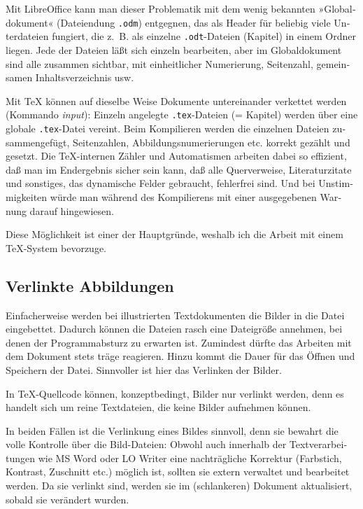 \documentclass[11pt,a4paper,ngerman,french,DIV=8]{scrartcl}
\begin{document}
\begin{otherlanguage}{ngerman}
Mit LibreOffice kann man dieser Problematik mit dem wenig bekannten »Globaldokument« (Dateiendung \texttt{.odm}) entgegnen, das als Header für beliebig viele Unterdateien fungiert, die z.~B. als einzelne \texttt{.odt}-Dateien (Kapitel) in einem Ordner liegen. Jede der Dateien läßt sich einzeln bearbeiten, aber im Globaldokument sind alle zusammen sichtbar, mit einheitlicher Numerierung, Seitenzahl, gemeinsamen Inhaltsverzeichnis usw.

Mit \TeX{} können auf dieselbe Weise Dokumente untereinander verkettet werden (Kommando \emph{input}): Einzeln angelegte \texttt{.tex}-Dateien (= Kapitel) werden über eine globale \texttt{.tex}-Datei vereint. Beim Kompilieren werden die einzelnen Dateien zusammengefügt, Seitenzahlen, Abbildungsnumerierungen etc. korrekt gezählt und gesetzt. Die \TeX{}-internen Zähler und Automatismen arbeiten dabei so effizient, daß man im Endergebnis sicher sein kann, daß alle Querverweise, Literaturzitate und sonstiges, das dynamische Felder gebraucht, fehlerfrei sind. Und bei Unstimmigkeiten würde man während des Kompilierens mit einer ausgegebenen Warnung darauf hingewiesen.

Diese Möglichkeit ist einer der Hauptgründe, weshalb ich die Arbeit mit einem \TeX{}-System bevorzuge.

\subsection{Verlinkte Abbildungen}

Einfacherweise werden bei illustrierten Textdokumenten die Bilder in die Datei eingebettet. Dadurch können die Dateien rasch eine Dateigröße annehmen, bei denen der Programmabsturz zu erwarten ist. Zumindest dürfte das Arbeiten mit dem Dokument stets träge reagieren. Hinzu kommt die Dauer für das Öffnen und Speichern der Datei. Sinnvoller ist hier das Verlinken der Bilder.

In \TeX{}-Quellcode können, konzeptbedingt, Bilder nur verlinkt werden, denn es handelt sich um reine Textdateien, die keine Bilder aufnehmen können.

In beiden Fällen ist die Verlinkung eines Bildes sinnvoll, denn sie bewahrt die volle Kontrolle über die Bild-Dateien: Obwohl auch innerhalb der Textverarbeitungen wie MS Word oder LO Writer eine nachträgliche Korrektur (Farbstich, Kontrast, Zuschnitt etc.) möglich ist, sollten sie extern verwaltet und bearbeitet werden. Da sie verlinkt sind, werden sie im (schlankeren) Dokument aktualisiert, sobald sie verändert wurden.

\end{otherlanguage}
\end{document}

